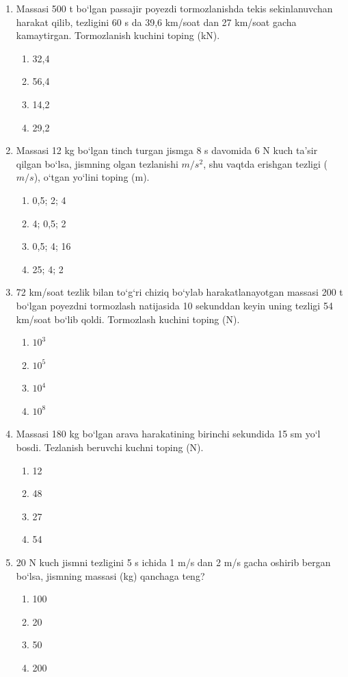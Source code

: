 \begin{enumerate}
\item Massasi 500 t bo‘lgan passajir poyezdi tormozlanishda tekis sekinlanuvchan harakat qilib, tezligini 60 s da 39,6 km/soat dan 27 km/soat gacha kamaytirgan. Tormozlanish kuchini toping (kN).
\begin{enumerate}[label=\Alph*)]
\item 32,4
\item 56,4
\item 14,2
\item 29,2
\end{enumerate}

\item Massasi 12 kg bo‘lgan tinch turgan jismga 8 s davomida 6 N kuch ta’sir qilgan bo‘lsa, jismning olgan tezlanishi $m/s^2$, shu vaqtda erishgan tezligi ($m/s$), o‘tgan yo‘lini toping (m).
\begin{enumerate}[label=\Alph*)]
\item 0,5; 2; 4
\item 4; 0,5; 2
\item 0,5; 4; 16
\item 25; 4; 2
\end{enumerate}

\item 72 km/soat tezlik bilan to‘g‘ri chiziq bo‘ylab harakatlanayotgan massasi 200 t bo‘lgan poyezdni tormozlash natijasida 10 sekunddan keyin uning tezligi 54 km/soat bo‘lib qoldi. Tormozlash kuchini toping (N).
\begin{enumerate}[label=\Alph*)]
\item $10^3$
\item $10^5$
\item $10^4$
\item $10^8$
\end{enumerate}

\item Massasi 180 kg bo‘lgan arava harakatining birinchi sekundida 15 sm yo‘l bosdi. Tezlanish beruvchi kuchni toping (N).
\begin{enumerate}[label=\Alph*)]
\item 12
\item 48
\item 27
\item 54
\end{enumerate}

\item 20 N kuch jismni tezligini 5 s ichida 1 m/s dan 2 m/s gacha oshirib bergan bo‘lsa, jismning massasi (kg) qanchaga teng?
\begin{enumerate}[label=\Alph*)]
\item 100
\item 20
\item 50
\item 200
\end{enumerate}


\end{enumerate}
